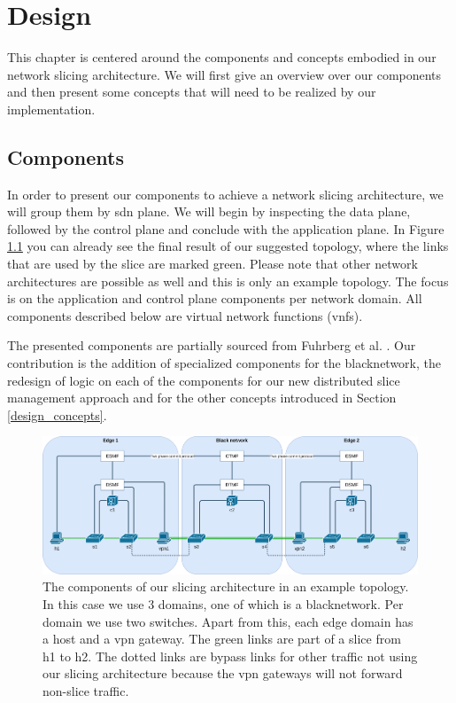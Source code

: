 \chapter{Design}
\label{design}

This chapter is centered around the components and concepts embodied in our network slicing architecture. We will first give an overview over our components and then present some concepts that will need to be realized by our implementation.


\section{Components}
In order to present our components to achieve a network slicing architecture, we will group them by \acrshort{sdn} plane. We will begin by inspecting the data plane, followed by the control plane and conclude with the application plane. In Figure \ref{fig:topology} you can already see the final result of our suggested topology, where the links that are used by the slice are marked green. Please note that other network architectures are possible as well and this is only an example topology. The focus is on the application and control plane components per network domain. All components described below are virtual network functions (\acrshort{vnf}s).

The presented components are partially sourced from Fuhrberg et al. \cite{SE4}. Our contribution is the addition of specialized components for the \gls{blacknetwork}, the redesign of logic on each of the components for our new distributed slice management approach and for the other concepts introduced in Section \ref{design_concepts}.

    \begin{figure}[ht]
        \centering
        \includegraphics[width=\linewidth]{images/chapter_5/topology.png}
        \caption[Slicing architecture components]{The components of our slicing architecture in an example topology. In this case we use 3 domains, one of which is a \gls{blacknetwork}. Per domain we use two switches. Apart from this, each edge domain has a host and a \acrshort{vpn} gateway. The green links are part of a slice from h1 to h2. The dotted links are bypass links for other traffic not using our slicing architecture because the \acrshort{vpn} gateways will not forward non-slice traffic.}
        \label{fig:topology}
    \end{figure}

